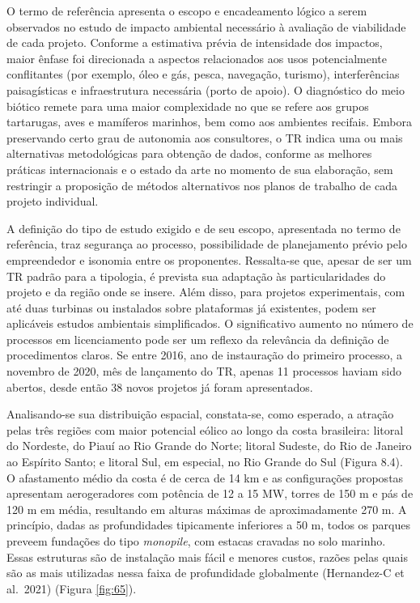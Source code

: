 \documentclass[
  oneside]{scrbook}
\begin{document}
O termo de referência apresenta o escopo e encadeamento lógico a serem observados no estudo de impacto ambiental necessário à avaliação de viabilidade de cada projeto. Conforme a estimativa prévia de intensidade dos impactos, maior ênfase foi direcionada a aspectos relacionados aos usos potencialmente conflitantes (por exemplo, óleo e gás, pesca, navegação, turismo), interferências paisagísticas e infraestrutura necessária (porto de apoio). O diagnóstico do meio biótico remete para uma maior complexidade no que se refere aos grupos tartarugas, aves e mamíferos marinhos, bem como aos ambientes recifais. Embora preservando certo grau de autonomia aos consultores, o TR indica uma ou mais alternativas metodológicas para obtenção de dados, conforme as melhores práticas internacionais e o estado da arte no momento de sua elaboração, sem restringir a proposição de métodos alternativos nos planos de trabalho de cada projeto individual.

A definição do tipo de estudo exigido e de seu escopo, apresentada no termo de referência, traz segurança ao processo, possibilidade de planejamento prévio pelo empreendedor e isonomia entre os proponentes. Ressalta-se que, apesar de ser um TR padrão para a tipologia, é prevista sua adaptação às particularidades do projeto e da região onde se insere. Além disso, para projetos experimentais, com até duas turbinas ou instalados sobre plataformas já existentes, podem ser aplicáveis estudos ambientais simplificados. O significativo aumento no número de processos em licenciamento pode ser um reflexo da relevância da definição de procedimentos claros. Se entre 2016, ano de instauração do primeiro processo, a novembro de 2020, mês de lançamento do TR, apenas 11 processos haviam sido abertos, desde então 38 novos projetos já foram apresentados.

Analisando-se sua distribuição espacial, constata-se, como esperado, a atração pelas três regiões com maior potencial eólico ao longo da costa brasileira: litoral do Nordeste, do Piauí ao Rio Grande do Norte; litoral Sudeste, do Rio de Janeiro ao Espírito Santo; e litoral Sul, em especial, no Rio Grande do Sul (Figura 8.4). O afastamento médio da costa é de cerca de 14 km e as configurações propostas apresentam aerogeradores com potência de 12 a 15 MW, torres de 150 m e pás de 120 m em média, resultando em alturas máximas de aproximadamente 270 m. A princípio, dadas as profundidades tipicamente inferiores a 50 m, todos os parques preveem fundações do tipo \emph{monopile}, com estacas cravadas no solo marinho. Essas estruturas são de instalação mais fácil e menores custos, razões pelas quais são as mais utilizadas nessa faixa de profundidade globalmente (Hernandez-C et al.~2021) (Figura \ref{fig:65}).
\end{document}
